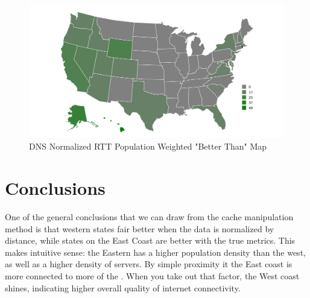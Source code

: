 \begin{figure}
    \centering
    \includegraphics{images/dns/analysis_auth_agg/rtt_normalized/population/num_better_than_map_norm_rtt_pop.png}
    \caption{DNS Normalized RTT Population Weighted "Better Than" Map}
    \label{fig:dns_auth_agg_num_better_map_norm_rtt_pop}
\end{figure}


\section{Conclusions}

One of the general conclusions that we can draw from the \dns cache manipulation method is that western states fair better when the data is normalized by distance, while states on the East Coast are better with the true \rtt metrics. This makes intuitive sense: the Eastern \us has a higher population density than the west, as well as a higher density of \dns servers. By simple proximity it the East coast is more connected to more of the \us. When you take out that factor, the West coast shines, indicating higher overall quality of internet connectivity.